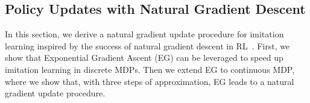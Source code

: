 \documentclass{article}
\begin{document}
\subsection{Policy Updates with Natural Gradient Descent}
In this section, we derive a natural gradient update procedure for imitation learning inspired by the success of natural gradient descent in RL~\cite{kakade2002natural,bagnell2003covariant,schulman2015trust}. First, we show that Exponential Gradient Ascent (EG) can be leveraged to speed up imitation learning in discrete MDPs. Then we extend EG to continuous MDP, where we show that, with three steps of approximation, EG leads to a natural gradient update procedure. 
\end{document}
